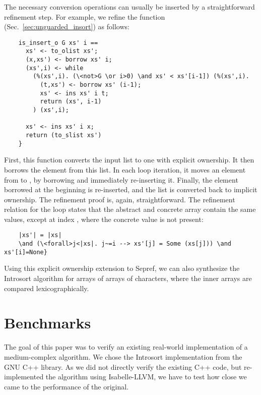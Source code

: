 \documentclass[sigplan,10pt,anonymous,review]{acmart}\settopmatter{printfolios=true,printccs=false,printacmref=false}
\theoremstyle{definition}
\begin{document}
  The necessary conversion operations can usually be inserted by a straightforward refinement step.
  For example, we refine the  function (Sec.~\ref{sec:unguarded_insort}) as follows:
  \begin{lstlisting}
    is_insert_o G xs' i ==
      xs' <- to_olist xs';
      (x,xs') <- borrow xs' i;
      (xs',i) <- while
        (%(xs',i). (\<not>G \or i>0) \and xs' < xs'[i-1]) (%(xs',i).
          (t,xs') <- borrow xs' (i-1);
          xs' <- ins xs' i t;
          return (xs', i-1)
        ) (xs',i);

      xs' <- ins xs' i x;
      return (to_slist xs')
    }
  \end{lstlisting}
  First, this function converts the input list  to one with explicit ownership.
  It then borrows the element  from this list. In each loop iteration, it moves an element
  from  to , by borrowing and immediately re-inserting it.
  Finally, the element borrowed at the beginning is re-inserted, and the list is converted back to implicit ownership.
  The refinement proof is, again, straightforward. The refinement relation for the loop states that the abstract and concrete array
  contain the same values, except at index , where the concrete value is not present:
  \begin{lstlisting}
    |xs'| = |xs|
    \and (\<forall>j<|xs|. j~=i --> xs'[j] = Some (xs[j])) \and xs'[i]=None}
  \end{lstlisting}


  Using this explicit ownership extension to Sepref, we can also synthesize the Introsort algorithm for arrays of arrays of characters,
  where the inner arrays are compared lexicographically.


%
%
%
%
%




\section{Benchmarks}
  The goal of this paper was to verify
  an existing real-world implementation of a medium-complex algorithm.
  We chose the Introsort implementation from the GNU C++ library. As we did not directly verify the existing C++ code,
  but re-implemented the algorithm using Isabelle-LLVM, we have to test how close we came to the performance of the original.
\end{document}
